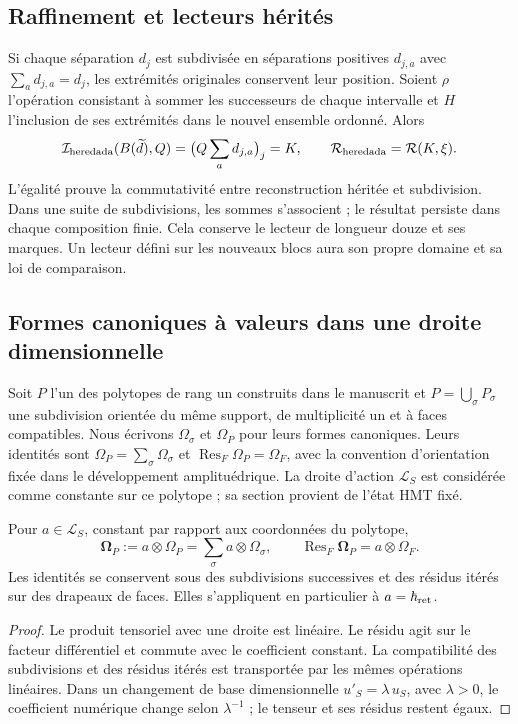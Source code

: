 \subsection{Raffinement et lecteurs hérités}

Si chaque séparation \(d_j\) est subdivisée en séparations positives \(d_{j,a}\) avec \(\sum_ad_{j,a}=d_j\), les extrémités originales conservent leur position. Soient \(\rho\) l'opération consistant à sommer les successeurs de chaque intervalle et \(H\) l'inclusion de ses extrémités dans le nouvel ensemble ordonné. Alors
\[
 \mathcal I_{\rm heredada}(B(\widetilde d),Q)
 =\bigl(Q\sum_ad_{j,a}\bigr)_j=K,
 \qquad
 \mathcal R_{\rm heredada}=\mathcal R(K,\xi).
\]
L’égalité prouve la commutativité entre reconstruction héritée et
subdivision. Dans une suite de subdivisions, les sommes s’associent ;
le résultat persiste dans chaque composition finie. Cela conserve le
lecteur de longueur douze et ses marques. Un lecteur défini sur les
nouveaux blocs aura son propre domaine et sa loi de comparaison.

\subsection{Formes canoniques à valeurs dans une droite dimensionnelle}

Soit \(P\) l’un des polytopes de rang un construits dans le
manuscrit et \(P=\bigcup_\sigma P_\sigma\) une subdivision
orientée du même support, de multiplicité un et à faces compatibles.
Nous écrivons \(\Omega_\sigma\) et \(\Omega_P\) pour leurs formes
canoniques. Leurs identités sont
\(\Omega_P=\sum_\sigma\Omega_\sigma\) et
\(\operatorname{Res}_F\Omega_P=\Omega_F\), avec la convention
d’orientation fixée dans le développement amplituédrique.
La droite d’action \(\mathcal L_S\) est considérée comme constante sur
ce polytope ; sa section provient de l’état HMT fixé.

\begin{theorem}
\label{thm:compat-forma-accion}
Pour \(a\in\mathcal L_S\), constant par rapport aux coordonnées du polytope,
\[
 \boldsymbol\Omega_P:=a\otimes\Omega_P
 =\sum_\sigma a\otimes\Omega_\sigma,
 \qquad
 \operatorname{Res}_F\boldsymbol\Omega_P=a\otimes\Omega_F.
\]
Les identités se conservent sous des subdivisions successives et des résidus
itérés sur des drapeaux de faces. Elles s’appliquent en particulier à
\(a=\hbar_{\rm ret}\).
\end{theorem}
\begin{proof}
Le produit tensoriel avec une droite est linéaire. Le résidu agit sur le facteur différentiel et commute avec le coefficient constant. La compatibilité des subdivisions et des résidus itérés est transportée par les mêmes opérations linéaires. Dans un changement de base dimensionnelle \(u'_S=\lambda\,u_S\), avec \(\lambda>0\), le coefficient numérique change selon \(\lambda^{-1}\) ; le tenseur et ses résidus restent égaux.
\end{proof}

